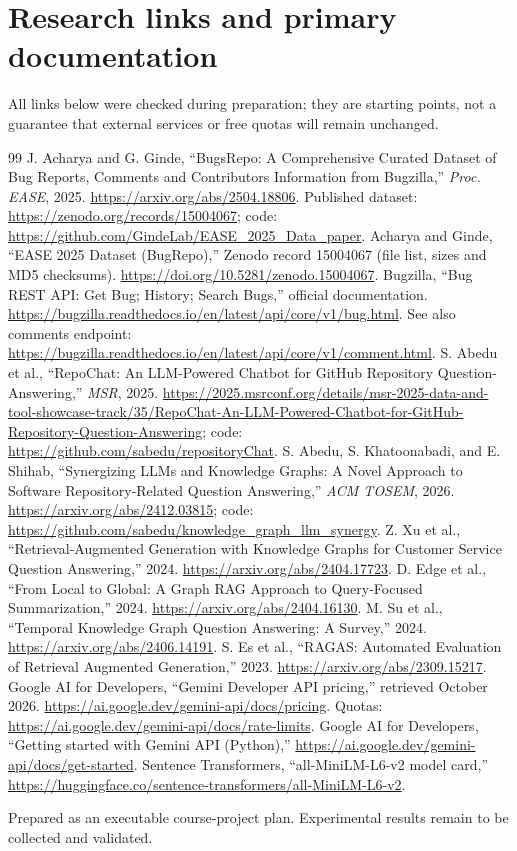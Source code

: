 \documentclass[11pt,a4paper]{article}
\begin{document}
\section{Research links and primary documentation}
All links below were checked during preparation; they are starting points, not a guarantee that external services or free quotas will remain unchanged.
\begin{thebibliography}{99}\setlength{\itemsep}{3pt}
 J. Acharya and G. Ginde, ``BugsRepo: A Comprehensive Curated Dataset of Bug Reports, Comments and Contributors Information from Bugzilla,'' \emph{Proc. EASE}, 2025. \url{https://arxiv.org/abs/2504.18806}. Published dataset: \url{https://zenodo.org/records/15004067}; code: \url{https://github.com/GindeLab/EASE_2025_Data_paper}.
 Acharya and Ginde, ``EASE 2025 Dataset (BugRepo),'' Zenodo record 15004067 (file list, sizes and MD5 checksums). \url{https://doi.org/10.5281/zenodo.15004067}.
 Bugzilla, ``Bug REST API: Get Bug; History; Search Bugs,'' official documentation. \url{https://bugzilla.readthedocs.io/en/latest/api/core/v1/bug.html}. See also comments endpoint: \url{https://bugzilla.readthedocs.io/en/latest/api/core/v1/comment.html}.
 S. Abedu et al., ``RepoChat: An LLM-Powered Chatbot for GitHub Repository Question-Answering,'' \emph{MSR}, 2025. \url{https://2025.msrconf.org/details/msr-2025-data-and-tool-showcase-track/35/RepoChat-An-LLM-Powered-Chatbot-for-GitHub-Repository-Question-Answering}; code: \url{https://github.com/sabedu/repositoryChat}.
 S. Abedu, S. Khatoonabadi, and E. Shihab, ``Synergizing LLMs and Knowledge Graphs: A Novel Approach to Software Repository-Related Question Answering,'' \emph{ACM TOSEM}, 2026. \url{https://arxiv.org/abs/2412.03815}; code: \url{https://github.com/sabedu/knowledge_graph_llm_synergy}.
 Z. Xu et al., ``Retrieval-Augmented Generation with Knowledge Graphs for Customer Service Question Answering,'' 2024. \url{https://arxiv.org/abs/2404.17723}.
 D. Edge et al., ``From Local to Global: A Graph RAG Approach to Query-Focused Summarization,'' 2024. \url{https://arxiv.org/abs/2404.16130}.
 M. Su et al., ``Temporal Knowledge Graph Question Answering: A Survey,'' 2024. \url{https://arxiv.org/abs/2406.14191}.
 S. Es et al., ``RAGAS: Automated Evaluation of Retrieval Augmented Generation,'' 2023. \url{https://arxiv.org/abs/2309.15217}.
 Google AI for Developers, ``Gemini Developer API pricing,'' retrieved October 2026. \url{https://ai.google.dev/gemini-api/docs/pricing}. Quotas: \url{https://ai.google.dev/gemini-api/docs/rate-limits}.
 Google AI for Developers, ``Getting started with Gemini API (Python),'' \url{https://ai.google.dev/gemini-api/docs/get-started}.
 Sentence Transformers, ``all-MiniLM-L6-v2 model card,'' \url{https://huggingface.co/sentence-transformers/all-MiniLM-L6-v2}.
\end{thebibliography}
\vfill
\begin{center}\small\color{muted}Prepared as an executable course-project plan. Experimental results remain to be collected and validated.\end{center}
\end{document}
